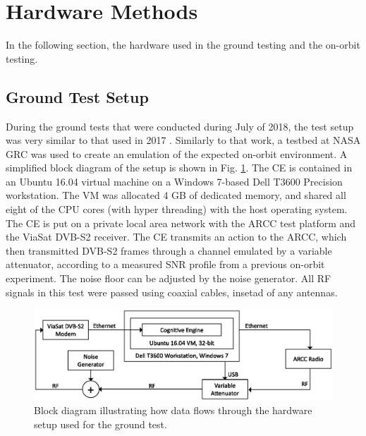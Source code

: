 \section{Hardware Methods}\label{methods:hardware}
\par In the following section, the hardware used in the ground testing and the on-orbit testing.
\subsection{Ground Test Setup}

\par During the ground tests that were conducted during July of 2018, the test setup was very similar to that used in 2017 \cite{tim_implementation_paper}.  Similarly to that work, a testbed at NASA GRC was used to create an emulation of the expected on-orbit environment. A simplified block diagram of the setup is shown in Fig. \ref{methods:groundTestFig}. The CE is contained in an Ubuntu 16.04 virtual machine on a Windows 7-based Dell T3600 Precision workstation. The VM was allocated 4 GB of dedicated memory, and shared all eight of the CPU cores (with hyper threading) with the host operating system. The CE is put on a private local area network with the ARCC test platform and the ViaSat DVB-S2 receiver. The CE transmits an action to the ARCC, which then transmitted DVB-S2 frames through a channel emulated by a variable attenuator, according to a measured SNR profile from a previous on-orbit experiment. The noise floor can be adjusted by the noise generator. All RF signals in this test were passed using coaxial cables, insetad of any antennas.
\begin{figure}[htb]
\includegraphics[width=\textwidth]{figures/test_setups_mod.eps}
\caption{Block diagram illustrating how data flows through the hardware setup used for the ground test.}\label{methods:groundTestFig}
\end{figure} 
\FloatBarrier
